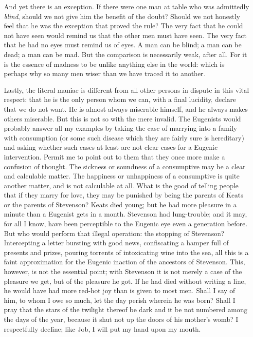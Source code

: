 \documentclass{book}
\begin{document}
And yet there is an exception. If there were one man at table who was admittedly \emph{blind}, should we not give him the benefit of the doubt? Should we not honestly feel that he was the exception that proved the rule? The very fact that he could not have seen would remind us that the other men must have seen. The very fact that he had no eyes must remind us of eyes. A man can be blind; a man can be dead; a man can be mad. But the comparison is necessarily weak, after all. For it is the essence of madness to be unlike anything else in the world: which is perhaps why so many men wiser than we have traced it to another.

Lastly, the literal maniac is different from all other persons in dispute in this vital respect: that he is the only person whom we can, with a final lucidity, declare that we do not want. He is almost always miserable himself, and he always makes others miserable. But this is not so with the mere invalid. The Eugenists would probably answer all my examples by taking the case of marrying into a family with consumption (or some such disease which they are fairly sure is hereditary) and asking whether such cases at least are not clear cases for a Eugenic intervention. Permit me to point out to them that they once more make a confusion of thought. The sickness or soundness of a consumptive may be a clear and calculable matter. The happiness or unhappiness of a consumptive is quite another matter, and is not calculable at all. What is the good of telling people that if they marry for love, they may be punished by being the parents of Keats or the parents of Stevenson? Keats died young; but he had more pleasure in a minute than a Eugenist gets in a month. Stevenson had lung-trouble; and it may, for all I know, have been perceptible to the Eugenic eye even a generation before. But who would perform that illegal operation: the stopping of Stevenson? Intercepting a letter bursting with good news, confiscating a hamper full of presents and prizes, pouring torrents of intoxicating wine into the sea, all this is a faint approximation for the Eugenic inaction of the ancestors of Stevenson. This, however, is not the essential point; with Stevenson it is not merely a case of the pleasure we get, but of the pleasure he got. If he had died without writing a line, he would have had more red-hot joy than is given to most men. Shall I say of him, to whom I owe so much, let the day perish wherein he was born? Shall I pray that the stars of the twilight thereof be dark and it be not numbered among the days of the year, because it shut not up the doors of his mother’s womb? I respectfully decline; like Job, I will put my hand upon my mouth.
\end{document}
